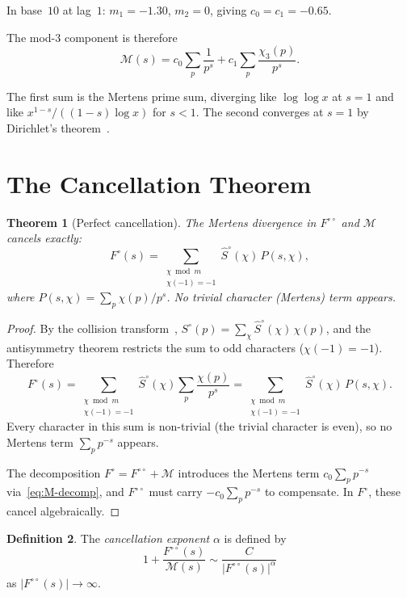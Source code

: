 \documentclass[12pt]{amsart}
\newtheorem{theorem}{Theorem}
\theoremstyle{definition}
\newtheorem{definition}[theorem]{Definition}
\theoremstyle{remark}
\begin{document}
In base~$10$ at lag~$1$: $m_1 = -1.30$, $m_2 = 0$,
giving $c_0 = c_1 = -0.65$.

The mod-$3$ component is therefore
\begin{equation}\label{eq:M-decomp}
\mathcal{M}(s) = c_0 \sum_p \frac{1}{p^s}
+ c_1 \sum_p \frac{\chi_3(p)}{p^s}.
\end{equation}

The first sum is the Mertens prime sum, diverging like
$\log\log x$ at $s = 1$ and like $x^{1-s}/((1{-}s)\log x)$
for $s < 1$. The second converges at $s = 1$ by
Dirichlet's theorem~\cite{davenport}.

\section{The Cancellation Theorem}

\begin{theorem}[Perfect cancellation]\label{thm:cancel}
The Mertens divergence in $F^{\circ\circ}$ and
$\mathcal{M}$ cancels exactly:
\[
F^{\circ}(s) = \sum_{\substack{\chi \bmod m \\
\chi(-1) = -1}} \hat{S}^{\circ}(\chi)\, P(s, \chi),
\]
where $P(s, \chi) = \sum_p \chi(p)/p^s$. No trivial
character (Mertens) term appears.
\end{theorem}

\begin{proof}
By the collision transform~\cite{paper16},
$S^{\circ}(p) = \sum_{\chi} \hat{S}^{\circ}(\chi)\,
\chi(p)$, and the antisymmetry theorem restricts
the sum to odd characters ($\chi(-1) = -1$). Therefore
\[
F^{\circ}(s) = \sum_{\substack{\chi \bmod m \\
\chi(-1) = -1}} \hat{S}^{\circ}(\chi)
\sum_p \frac{\chi(p)}{p^s}
= \sum_{\substack{\chi \bmod m \\
\chi(-1) = -1}} \hat{S}^{\circ}(\chi)\, P(s, \chi).
\]
Every character in this sum is non-trivial (the trivial
character is even), so no Mertens term
$\sum_p p^{-s}$ appears.

The decomposition $F^{\circ} = F^{\circ\circ} +
\mathcal{M}$ introduces the Mertens term
$c_0 \sum_p p^{-s}$ via~\eqref{eq:M-decomp}, and
$F^{\circ\circ}$ must carry $-c_0 \sum_p p^{-s}$ to
compensate. In $F^{\circ}$, these cancel algebraically.
\end{proof}

\begin{definition}
The \emph{cancellation exponent} $\alpha$ is defined by
\[
1 + \frac{F^{\circ\circ}(s)}{\mathcal{M}(s)}
\sim \frac{C}{|F^{\circ\circ}(s)|^{\alpha}}
\]
as $|F^{\circ\circ}(s)| \to \infty$.
\end{definition}
\end{document}
